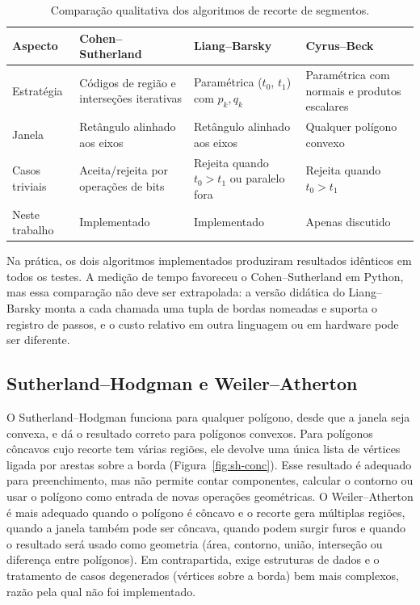 \documentclass[11pt, a4paper]{article}
\begin{document}
\begin{table}[htbp]
  \centering
  \small
  \caption{Comparação qualitativa dos algoritmos de recorte de segmentos.}
  \label{tab:comp-rec}
  \begin{tabularx}{\textwidth}{l X X X}
    \toprule
    \textbf{Aspecto} & \textbf{Cohen--Sutherland} & \textbf{Liang--Barsky} & \textbf{Cyrus--Beck} \\
    \midrule
    Estratégia & Códigos de região e interseções iterativas & Paramétrica ($t_0$, $t_1$) com $p_k,q_k$ & Paramétrica com normais e produtos escalares \\
    Janela & Retângulo alinhado aos eixos & Retângulo alinhado aos eixos & Qualquer polígono convexo \\
    Casos triviais & Aceita/rejeita por operações de bits & Rejeita quando $t_0>t_1$ ou paralelo fora & Rejeita quando $t_0>t_1$ \\
    Neste trabalho & Implementado & Implementado & Apenas discutido \\
    \bottomrule
  \end{tabularx}
\end{table}

Na prática, os dois algoritmos implementados produziram resultados idênticos em todos os testes. A medição de tempo favoreceu o Cohen--Sutherland em Python, mas essa comparação não deve ser extrapolada: a versão didática do Liang--Barsky monta a cada chamada uma tupla de bordas nomeadas e suporta o registro de passos, e o custo relativo em outra linguagem ou em hardware pode ser diferente.

\subsection{Sutherland--Hodgman e Weiler--Atherton}
O Sutherland--Hodgman funciona para qualquer polígono, desde que a janela seja convexa, e dá o resultado correto para polígonos convexos. Para polígonos côncavos cujo recorte tem várias regiões, ele devolve uma única lista de vértices ligada por arestas sobre a borda (Figura~\ref{fig:sh-conc}). Esse resultado é adequado para preenchimento, mas não permite contar componentes, calcular o contorno ou usar o polígono como entrada de novas operações geométricas. O Weiler--Atherton é mais adequado quando o polígono é côncavo e o recorte gera múltiplas regiões, quando a janela também pode ser côncava, quando podem surgir furos e quando o resultado será usado como geometria (área, contorno, união, interseção ou diferença entre polígonos). Em contrapartida, exige estruturas de dados e o tratamento de casos degenerados (vértices sobre a borda) bem mais complexos, razão pela qual não foi implementado.
\end{document}
